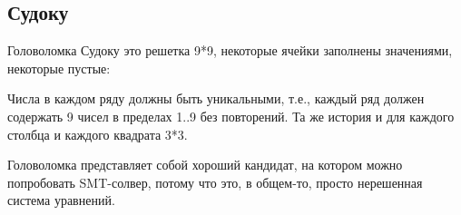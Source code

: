 \subsection{Судоку}

Головоломка Судоку это решетка 9*9, некоторые ячейки заполнены значениями, некоторые пустые:


\newcommand\setrow[9]{
  \setcounter{col}{1}
  \foreach \n in {#1, #2, #3, #4, #5, #6, #7, #8, #9} {
    \edef\x{\value{col} - 0.5}
    \edef\y{9.5 - \value{row}}
    \node[anchor=center] at (\x, \y) {\n};
    \stepcounter{col}
  }
  \stepcounter{row}
}

\begin{center}
\end{center}

Числа в каждом ряду должны быть уникальными, т.е., каждый ряд должен содержать 9 чисел в пределах 1..9 без повторений.
Та же история и для каждого столбца и каждого квадрата 3*3.

Головоломка представляет собой хороший кандидат, на котором можно попробовать \ac{SMT}-солвер, потому что это,
в общем-то, просто нерешенная система уравнений.


%
%



